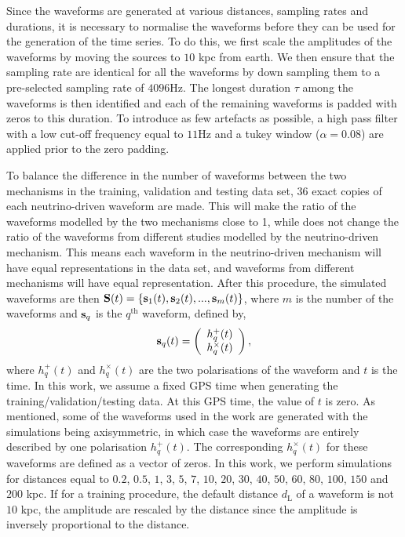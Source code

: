 \documentclass[aps,twocolumn,showpacs,groupedaddress, nofootinbib]{revtex4}  %
\begin{document}
%
%
Since the waveforms are generated at various distances, sampling rates and
durations, it is necessary to normalise the waveforms before they can be used
for the generation of the time series. To do this, we first scale the
amplitudes of the waveforms by moving the sources to $10$ kpc from earth. We
then ensure that the sampling rate are identical for all the waveforms by down
sampling them to a pre-selected sampling rate of $4096$Hz. The longest duration
$\tau$ among the waveforms is then identified and each of the remaining
waveforms is padded with zeros to this duration. To introduce as few artefacts
as possible, a high pass filter with a low cut-off frequency equal to $11$Hz
and a tukey window ($\alpha = 0.08$) are applied prior to the zero padding. 

%
%
To balance the difference in the number of waveforms between the two mechanisms
in the training, validation and testing data set, $36$ exact copies of each neutrino-driven waveform are
made. This will make the ratio of the waveforms modelled by the two mechanisms close to 1, 
while does not change the ratio of the waveforms from different studies modelled by the neutrino-driven mechanism. 
This means each waveform in the neutrino-driven mechanism will have equal representations in the data set,
and waveforms from different mechanisms will have equal representation.
After this procedure, the simulated waveforms are then $\bold{S}(t) = \{\bold{s}_{1}(t), \bold{s}_{2}(t),
..., \bold{s}_{m}(t)\}$, where $m$ is the number of the waveforms and
$\bold{s}_{q}$ is the $q^{\text{th}}$ waveform, defined by, 
%
\begin{equation}\label{eq:ht}
\bold{s}_q(t) = \left(\begin{array}{c} h_q^+(t) \\ h_q^\times(t)
\end{array}\right), 
\end{equation} 
%
where $h_q^+(t)$ and $h_q^\times(t)$ are the two polarisations of the waveform
and $t$ is the time. In this work, we assume a 
fixed GPS time when generating the training/validation/testing data. 
At this GPS time, the value of $t$ is zero.
As mentioned, some of the waveforms used in the work are
generated with the simulations being axisymmetric, in which case the waveforms
are entirely described by one polarisation $h_q^+(t)$. The corresponding
$h_q^\times(t)$ for these waveforms are defined as a vector of zeros. 
%
%
In this work, we perform simulations for distances equal to $0.2$, $0.5$, $1$, $3$, $5$, $7$, $10$, $20$, $30$,
$40$, $50$, $60$, $80$, $100$, $150$ and $200$ kpc. If for a training
procedure, the default distance $d_\text{L}$ of a waveform is not $10$ kpc, the amplitude are rescaled 
by the distance since the amplitude is inversely proportional to the distance.
\end{document}
